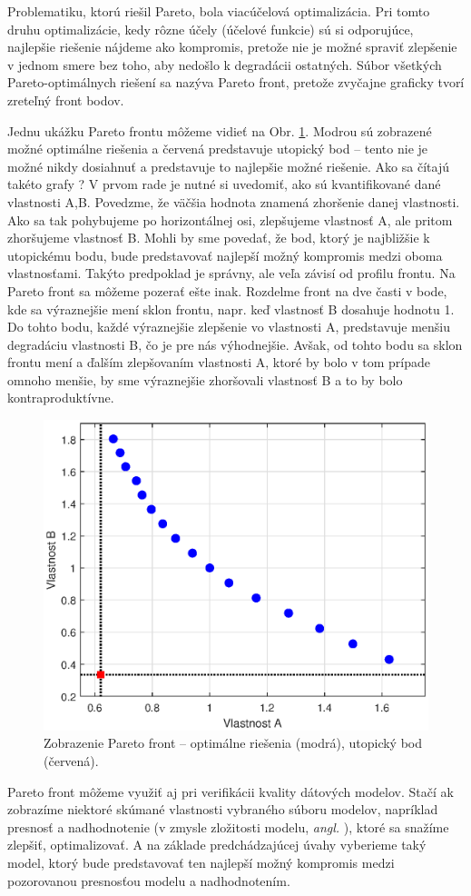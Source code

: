 Problematiku, ktorú riešil Pareto, bola viacúčelová optimalizácia. Pri tomto druhu optimalizácie, kedy rôzne účely (účelové funkcie) sú si odporujúce, najlepšie riešenie nájdeme ako kompromis, pretože nie je možné spraviť zlepšenie v jednom smere bez toho, aby nedošlo k degradácii ostatných. Súbor všetkých Pareto-optimálnych riešení sa nazýva Pareto front, pretože zvyčajne graficky tvorí zreteľný front bodov.

Jednu ukážku Pareto frontu môžeme vidieť na Obr. \ref{fig:Pareto_example}. Modrou sú zobrazené možné optimálne riešenia a červená predstavuje utopický bod -- tento nie je možné nikdy dosiahnuť a predstavuje to najlepšie možné riešenie. Ako sa čítajú takéto grafy ? V prvom rade je nutné si uvedomiť, ako sú kvantifikované dané vlastnosti A,B. Povedzme, že väčšia hodnota znamená zhoršenie danej vlastnosti. Ako sa tak pohybujeme po horizontálnej osi, zlepšujeme vlastnosť A, ale pritom zhoršujeme vlastnosť B. Mohli by sme povedať, že bod, ktorý je najbližšie k utopickému bodu, bude predstavovať najlepší možný kompromis medzi oboma vlastnosťami. Takýto predpoklad je správny, ale veľa závisí od profilu frontu. Na Pareto front sa môžeme pozerať ešte inak. Rozdelme front na dve časti v bode, kde sa výraznejšie mení sklon frontu, napr. keď vlastnosť B dosahuje hodnotu 1. Do tohto bodu, každé výraznejšie zlepšenie vo vlastnosti A, predstavuje menšiu degradáciu vlastnosti B, čo je pre nás výhodnejšie. Avšak, od tohto bodu sa sklon frontu mení a ďalším zlepšovaním vlastnosti A, ktoré by bolo v tom prípade omnoho menšie, by sme výraznejšie zhoršovali vlastnosť B a to by bolo kontraproduktívne.

\begin{figure}
	\centering
	\includegraphics[width=0.7\linewidth]{images/Pareto_ex}
	\caption{Zobrazenie Pareto front -- optimálne riešenia (modrá), utopický bod (červená).}
	\label{fig:Pareto_example}
\end{figure}

Pareto front môžeme využiť aj pri verifikácii kvality dátových modelov. Stačí ak zobrazíme niektoré skúmané vlastnosti vybraného súboru modelov, napríklad presnosť a nadhodnotenie (v zmysle zložitosti modelu, \textit{angl. }), ktoré sa snažíme zlepšiť, optimalizovať. A na základe predchádzajúcej úvahy vyberieme taký model, ktorý bude predstavovať ten najlepší možný kompromis medzi pozorovanou presnosťou modelu a nadhodnotením.